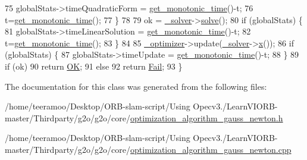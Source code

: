\begin{DoxyCode}
75       globalStats->timeQuadraticForm = \hyperlink{namespaceg2o_aa64237935c7d8411b4369234a5f661ea}{get\_monotonic\_time}()-t;
76       t=\hyperlink{namespaceg2o_aa64237935c7d8411b4369234a5f661ea}{get\_monotonic\_time}();
77     \}
78 
79     ok = \hyperlink{classg2o_1_1OptimizationAlgorithmWithHessian_a88a2d1dccee8f7481ece407f2681a151}{\_solver}->\hyperlink{classg2o_1_1Solver_a9c359a886db57f2f81e54a2113f3bd38}{solve}();
80     \textcolor{keywordflow}{if} (globalStats) \{
81       globalStats->timeLinearSolution = \hyperlink{namespaceg2o_aa64237935c7d8411b4369234a5f661ea}{get\_monotonic\_time}()-t;
82       t=\hyperlink{namespaceg2o_aa64237935c7d8411b4369234a5f661ea}{get\_monotonic\_time}();
83     \}
84 
85     \hyperlink{classg2o_1_1OptimizationAlgorithm_a6017c344be0d9f09d6674849849c6b60}{\_optimizer}->update(\hyperlink{classg2o_1_1OptimizationAlgorithmWithHessian_a88a2d1dccee8f7481ece407f2681a151}{\_solver}->\hyperlink{classg2o_1_1Solver_acb097d8568624a1f3af4dba808e5593b}{x}());
86     \textcolor{keywordflow}{if} (globalStats) \{
87       globalStats->timeUpdate = \hyperlink{namespaceg2o_aa64237935c7d8411b4369234a5f661ea}{get\_monotonic\_time}()-t;
88     \}
89     \textcolor{keywordflow}{if} (ok)
90       \textcolor{keywordflow}{return} \hyperlink{classg2o_1_1OptimizationAlgorithm_a705d58d7bc19528a8ab718570d090cdfa5e94b8ee7748cc4c1a5c86de2e8cc962}{OK};
91     \textcolor{keywordflow}{else}
92       \textcolor{keywordflow}{return} \hyperlink{classg2o_1_1OptimizationAlgorithm_a705d58d7bc19528a8ab718570d090cdfa375598c3a146bb5116b5d19bb1a88f84}{Fail};
93   \}
\end{DoxyCode}


The documentation for this class was generated from the following files\+:\begin{DoxyCompactItemize}
\item 
/home/teeramoo/\+Desktop/\+O\+R\+B-\/slam-\/script/\+Using Opecv3./\+Learn\+V\+I\+O\+R\+B-\/master/\+Thirdparty/g2o/g2o/core/\hyperlink{optimization__algorithm__gauss__newton_8h}{optimization\+\_\+algorithm\+\_\+gauss\+\_\+newton.\+h}\item 
/home/teeramoo/\+Desktop/\+O\+R\+B-\/slam-\/script/\+Using Opecv3./\+Learn\+V\+I\+O\+R\+B-\/master/\+Thirdparty/g2o/g2o/core/\hyperlink{optimization__algorithm__gauss__newton_8cpp}{optimization\+\_\+algorithm\+\_\+gauss\+\_\+newton.\+cpp}\end{DoxyCompactItemize}
